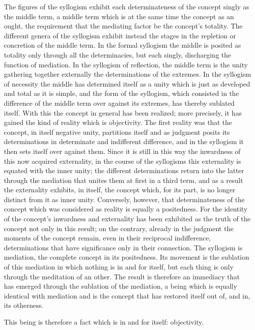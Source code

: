 The figures of the syllogism exhibit each determinateness of
the concept singly as the middle term,
a middle term which is at the same time the concept as an ought,
the requirement that the mediating factor be the concept's totality.
The different genera of the syllogism exhibit instead the stages
in the repletion or concretion of the middle term.
In the formal syllogism the middle is posited as totality
only through all the determinacies,
but each singly, discharging the function of mediation.
In the syllogism of reflection, the middle term is the unity
gathering together externally the determinations of the extremes.
In the syllogism of necessity the middle
has determined itself as a unity
which is just as developed and total as it is
simple, and the form of the syllogism,
which consisted in the difference of
the middle term over against its extremes,
has thereby sublated itself.
With this the concept in general has been realized;
more precisely, it has gained the kind of reality which is objectivity.
The first reality was that the concept,
in itself negative unity, partitions itself
and as judgment posits its determinations
in determinate and indifferent difference,
and in the syllogism it then sets itself over against them.
Since it is still in this way the inwardness
of this now acquired externality,
in the course of the syllogisms this externality is
equated with the inner unity;
the different determinations return into the latter
through the mediation that unites them at first in a third term,
and as a result the externality exhibits, in itself,
the concept which, for its part,
is no longer distinct from it as inner unity.
Conversely, however, that determinateness of the concept
which was considered as reality is equally a positedness.
For the identity of the concept's inwardness and externality
has been exhibited as the truth of the concept
not only in this result;
on the contrary, already in the judgment
the moments of the concept remain,
even in their reciprocal indifference,
determinations that have significance
only in their connection.
The syllogism is mediation,
the complete concept in its positedness.
Its movement is the sublation of this mediation
in which nothing is in and for itself,
but each thing is only through the meditation of an other.
The result is therefore an immediacy that has emerged
through the sublation of the mediation,
a being which is equally identical with mediation
and is the concept that has restored itself
out of, and in, its otherness.

This being is therefore a fact
which is in and for itself: objectivity.
